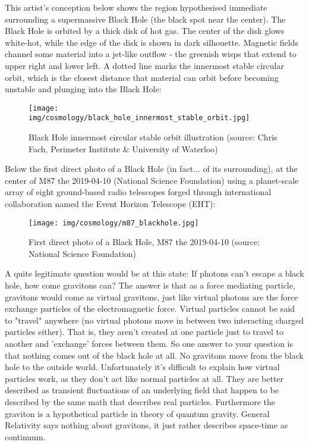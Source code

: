 	This artist's conception below shows the region hypothesised immediate surrounding a supermassive Black Hole (the black spot near the center). The Black Hole is orbited by a thick disk of hot gas. The center of the disk glows white-hot, while the edge of the disk is shown in dark silhouette. Magnetic fields channel some material into a jet-like outflow - the greenish wisps that extend to upper right and lower left. A dotted line marks the innermost stable circular orbit, which is the closest distance that material can orbit before becoming unstable and plunging into the Black Hole:
	\begin{figure}[H]
		\centering
		\texttt{[image: img/cosmology/black\_hole\_innermost\_stable\_orbit.jpg]}
		\captionsetup{width=0.6\linewidth}
		\caption[Black Hole innermost circular stable orbit illustration]{Black Hole innermost circular stable orbit illustration (source: Chris Fach, Perimeter Institute \& University of Waterloo)}
	\end{figure}
	Below the first direct photo of a Black Hole (in fact... of its surrounding), at the center of M87 the 2019-04-10 (National Science Foundation) using a planet-scale array of eight ground-based radio telescopes forged through international collaboration named the Event Horizon Telescope (EHT):
	\begin{figure}[H]
		\centering
		\texttt{[image: img/cosmology/m87\_blackhole.jpg]}
		\caption[First direct photo of a Black Hole]{First direct photo of a Black Hole, M87 the 2019-04-10 (source: National Science Foundation)}
	\end{figure}
	
	\begin{tcolorbox}[title=Remark,colframe=black,arc=10pt]
	A quite legitimate question would be at this state: If photons can't escape a black hole, how come gravitons can? The answer is that as a force mediating particle, gravitons would come as virtual gravitons, just like virtual photons are the force exchange particles of the electromagnetic force. Virtual particles cannot be said to "travel" anywhere (no virtual photons move in between two interacting charged particles either). That is, they aren't created at one particle just to travel to another and 'exchange' forces between them. So one answer to your question is that nothing comes out of the black hole at all. No gravitons move from the black hole to the outside world. Unfortunately it's difficult to explain how virtual particles work, as they don't act like normal particles at all. They are better described as transient fluctuations of an underlying field that happen to be described by the same math that describes real particles. Furthermore the graviton is a hypothetical particle in theory of quantum gravity. General Relativity says nothing about gravitons, it just rather describes space-time as continuum.
	\end{tcolorbox}
	
